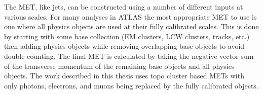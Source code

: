 The MET, like jets, can be constructed using a number of different inputs at various scales.  
For many analyses in ATLAS the most appropriate MET to use is one where all physics objects are used at their fully calibrated scales.  
This is done by starting with some base collection (EM clusters, LCW clusters, tracks, etc.) then adding physics objects while removing overlapping base objects to avoid double counting.  
The final MET is calculated by taking the negative vector sum of the transverse momentum of the remaining base objects and all physics objects.  
The work described in this thesis uses topo cluster based METs with only photons, electrons, and muons being replaced by the fully calibrated objects.  




